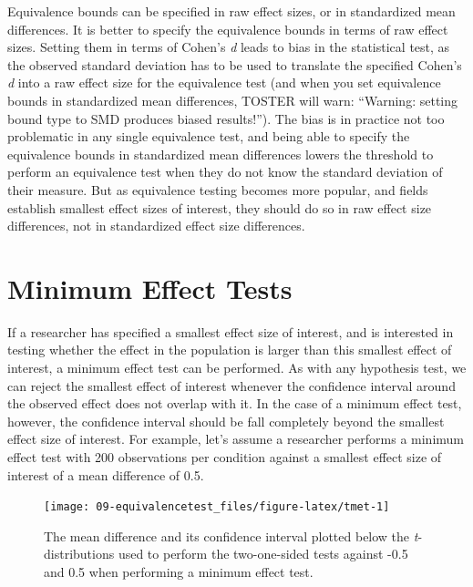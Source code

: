 \documentclass[
  oneside]{book}
\begin{document}
Equivalence bounds can be specified in raw effect sizes, or in standardized mean differences. It is better to specify the equivalence bounds in terms of raw effect sizes. Setting them in terms of Cohen's \emph{d} leads to bias in the statistical test, as the observed standard deviation has to be used to translate the specified Cohen's \emph{d} into a raw effect size for the equivalence test (and when you set equivalence bounds in standardized mean differences, TOSTER will warn: ``Warning: setting bound type to SMD produces biased results!''). The bias is in practice not too problematic in any single equivalence test, and being able to specify the equivalence bounds in standardized mean differences lowers the threshold to perform an equivalence test when they do not know the standard deviation of their measure. But as equivalence testing becomes more popular, and fields establish smallest effect sizes of interest, they should do so in raw effect size differences, not in standardized effect size differences.

\hypertarget{MET}{%
\section{Minimum Effect Tests}\label{MET}}

If a researcher has specified a smallest effect size of interest, and is interested in testing whether the effect in the population is larger than this smallest effect of interest, a minimum effect test can be performed. As with any hypothesis test, we can reject the smallest effect of interest whenever the confidence interval around the observed effect does not overlap with it. In the case of a minimum effect test, however, the confidence interval should be fall completely beyond the smallest effect size of interest. For example, let's assume a researcher performs a minimum effect test with 200 observations per condition against a smallest effect size of interest of a mean difference of 0.5.



\begin{figure}

{\centering \texttt{[image: 09-equivalencetest\_files/figure-latex/tmet-1]} 

}

\caption{The mean difference and its confidence interval plotted below the \emph{t}-distributions used to perform the two-one-sided tests against -0.5 and 0.5 when performing a minimum effect test.}\label{fig:tmet}
\end{figure}
\end{document}
